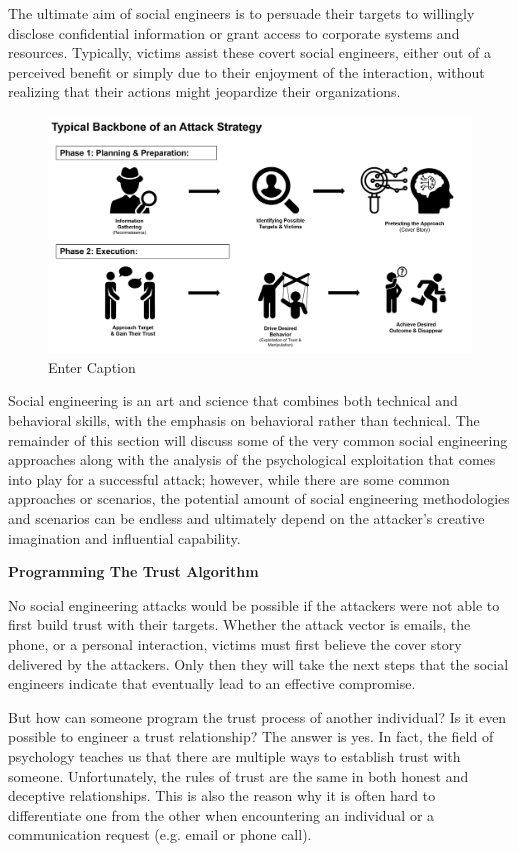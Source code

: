 The ultimate aim of social engineers is to persuade their targets to willingly disclose confidential information or grant access to corporate systems and resources. Typically, victims assist these covert social engineers, either out of a perceived benefit or simply due to their enjoyment of the interaction, without realizing that their actions might jeopardize their organizations.\begin{figure}
    \justifying
    \includegraphics[width=0.75\linewidth]{socengattstr.png}
    \caption{Enter Caption}
    \label{fig:placeholder}
\end{figure}
 
Social engineering is an art and science that combines both technical and behavioral skills, with the emphasis on behavioral rather than technical. The remainder of this section will discuss some of the very common social engineering approaches along with the analysis of the psychological exploitation that comes into play for a successful attack; however, while there are some common approaches or scenarios, the potential amount of social engineering methodologies and scenarios can be endless and ultimately depend on the attacker's creative imagination and influential capability.

\textbf{Programming The Trust Algorithm}

No social engineering attacks would be possible if the attackers were not able to first build trust with their targets. Whether the attack vector is emails, the phone, or a personal interaction, victims must first believe the cover story delivered by the attackers. Only then they will take the next steps that the social engineers indicate that eventually lead to an effective compromise.

But how can someone program the trust process of another individual? Is it even possible to engineer a trust relationship? The answer is yes. In fact, the field of psychology teaches us that there are multiple ways to establish trust with someone. Unfortunately, the rules of trust are the same in both honest and deceptive relationships. This is also the reason why it is often hard to differentiate one from the other when encountering an individual or a communication request (e.g. email or phone call).

